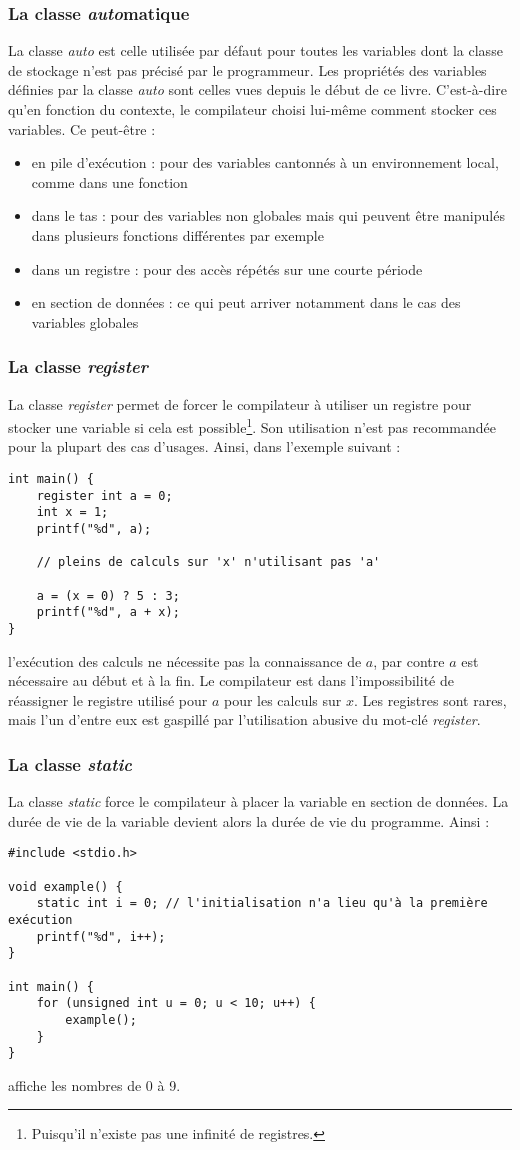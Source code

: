 \documentclass[../../../main.tex]{subfiles}
\begin{document}
\subsubsection{La classe \textit{auto}matique}
La classe \textit{auto} est celle utilisée par défaut pour toutes les variables dont la classe de stockage n'est pas précisé par le programmeur. Les propriétés des variables définies par la classe \textit{auto} sont celles vues depuis le début de ce livre. C'est-à-dire qu'en fonction du contexte, le compilateur choisi lui-même comment stocker ces variables. Ce peut-être : 
\begin{itemize}
	\item en pile d'exécution : pour des variables cantonnés à un environnement local, comme dans une fonction
	\item dans le tas : pour des variables non globales mais qui peuvent être manipulés dans plusieurs fonctions différentes par exemple
	\item dans un registre : pour des accès répétés sur une courte période
	\item en section de données : ce qui peut arriver notamment dans le cas des variables globales
\end{itemize}
\subsubsection{La classe \textit{register}}
La classe \textit{register} permet de forcer le compilateur à utiliser un registre pour stocker une variable si cela est possible\footnote{Puisqu'il n'existe pas une infinité de registres.}. Son utilisation n'est pas recommandée pour la plupart des cas d'usages. Ainsi, dans l'exemple suivant :
\begin{verbatim}
int main() {
	register int a = 0;
	int x = 1;
	printf("%d", a);
	
	// pleins de calculs sur 'x' n'utilisant pas 'a'
	
	a = (x = 0) ? 5 : 3;
	printf("%d", a + x);
}
\end{verbatim}
l'exécution des calculs ne nécessite pas la connaissance de $a$, par contre $a$ est nécessaire au début et à la fin. Le compilateur est dans l'impossibilité de réassigner le registre utilisé pour $a$ pour les calculs sur $x$. Les registres sont rares, mais l'un d'entre eux est gaspillé par l'utilisation abusive du mot-clé \textit{register}. 
\subsubsection{La classe \textit{static}}
La classe \textit{static} force le compilateur à placer la variable en section de données. La durée de vie de la variable devient alors la durée de vie du programme. Ainsi :
\begin{verbatim}
#include <stdio.h>

void example() {
	static int i = 0; // l'initialisation n'a lieu qu'à la première exécution
	printf("%d", i++);
}

int main() {
	for (unsigned int u = 0; u < 10; u++) {
		example();
	}
}
\end{verbatim}
affiche les nombres de 0 à 9.
\end{document}

